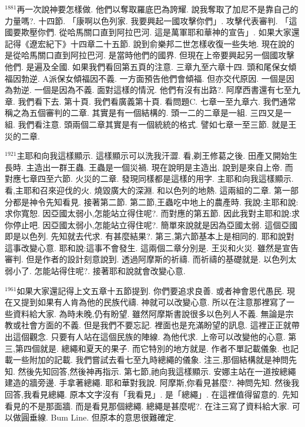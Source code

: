 \documentclass{book}
\begin{document}
$^{1881}$再一次說神要怎樣做.
他們以奪取羅底巴為誇耀.
說我奪取了加尼不是靠自己的力量嗎?.
十四節.
「康啊以色列家.
我要興起一國攻擊你們」.
攻擊代表審判.
「這國要欺壓你們.
從哈馬關口直到阿拉巴河.
這是萬軍耶和華神的宣告」.
如果大家還記得《遼宏紀下》十四章二十五節.
說到俞樂邦二世怎樣收復一些失地.
現在說的是從哈馬關口直到阿拉巴河.
是當時他們的國界.
但現在上帝要興起另一個國攻擊他們.
是遍及全國.
如果我們看回第五頁的注意.
三章九至六章十四.
頭和尾保女傾福因勃逆.
A派保女傾福因不義.
一方面預告他們會傾福.
但亦交代原因.
一個是因為勃逆.
一個是因為不義.
面對這樣的情況.
他們有沒有出路?.
阿摩西書還有七至九章.
我們看下去.
第十頁.
我們看廣義第十頁.
看問題C.
七章一至九章六.
我們通常稱之為五個審判的二章.
其實是有一個結構的.
頭一二的二章是一組.
三四又是一組.
我們看注意.
頭兩個二章其實是有一個統統的格式.
譬如七章一至三節.
就是王災的二章.

$^{1921}$主耶和向我這樣顯示.
這樣顯示可以洗我汗澀.
看,剃王修葛之後.
田產又開始生長時.
主造出一群王蟲.
王蟲是一個災禍.
現在說明是主造出.
說到是來自上帝.
而對應七章四至六節.
火災的二章.
發現同樣都是這樣的用字.
主耶和向我這樣顯示.
看,主耶和召來迎伐的火.
燒毀廣大的深淵.
和以色列的地熱.
這兩組的二章.
第一部分都是神令先知看見.
接著第二節.
第二節,王蟲吃中地上的農產時.
我說:主耶和說:求你寬恕.
因亞國太弱小,怎能站立得住呢?.
而對應的第五節.
因此我對主耶和說:求你停止吧.
因亞國太弱小,怎能站立得住呢?.
簡單來說就是因為亞國太弱.
這個亞國即是以色列.
先知就去代求.
有甚麼結果?.
第三,第六節基本上是相同的.
耶和說對這事改變心意.
耶和說:這事不會發生.
這兩個二章分別是.
王災和火災.
雖然是宣告審判.
但是作者的設計刻意說到.
透過阿摩斯的祈禱.
而祈禱的基礎就是.
以色列太弱小了.
怎能站得住呢?.
接著耶和說就會改變心意.

$^{1961}$如果大家還記得上文五章十五節提到.
你們要追求良善.
或者神會恩代愚民.
現在又提到如果有人肯為他的民族代禱.
神就可以改變心意.
所以在注意那裡寫了一些資料給大家.
為時未晚,仍有盼望.
雖然阿摩斯書說很多以色列人不義.
無論是宗教或社會方面的不義.
但是我們不要忘記.
裡面也是充滿盼望的訊息.
這裡正正就帶出這個觀念.
只要有人站在這個民族的陣線.
為他代求.
上帝可以改變他的心意.
第三,第四個就是.
總繩和夏天的果子.
而它特別的地方就是.
作者不單記載儀象.
也記載一些附加的記載.
我們嘗試去看七至九時總繩的儀象.
注三,那個結構就是神問先知.
然後先知回答,然後神再指示.
第七節,祂向我這樣顯示.
安娜主站在一道按總繩建造的牆旁邊.
手拿著總繩.
耶和華對我說.
阿摩斯,你看見甚麼?.
神問先知.
然後我回答,我看見總繩.
原本文字沒有「我看見」.
是「總繩」.
在這裡值得留意的.
先知看見的不是那面牆.
而是看見那個總繩.
總繩是甚麼呢?.
在注三寫了資料給大家.
可以做圓垂線.
Bum Line.
但原本的意思很難確定.
\end{document}
